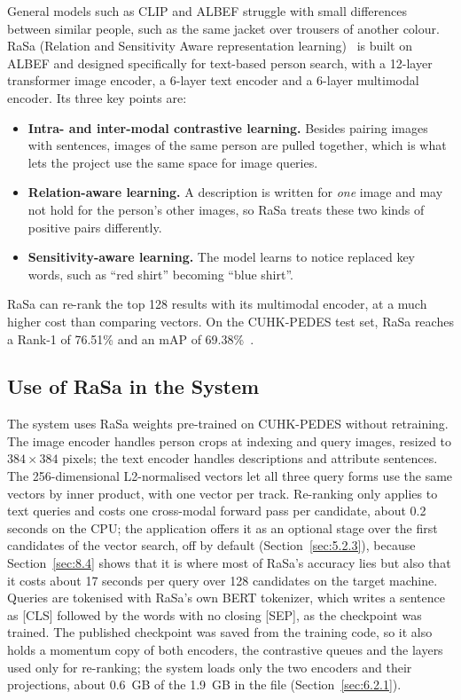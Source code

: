 General models such as CLIP and ALBEF struggle with small differences between similar people, such as the same jacket over trousers of another colour. RaSa (Relation and Sensitivity Aware representation learning)~\cite{bai2023rasa} is built on ALBEF and designed specifically for text-based person search, with a 12-layer transformer image encoder, a 6-layer text encoder and a 6-layer multimodal encoder. Its three key points are:
\begin{itemize}
    \item \textbf{Intra- and inter-modal contrastive learning.} Besides pairing images with sentences, images of the same person are pulled together, which is what lets the project use the same space for image queries.
    \item \textbf{Relation-aware learning.} A description is written for \emph{one} image and may not hold for the person's other images, so RaSa treats these two kinds of positive pairs differently.
    \item \textbf{Sensitivity-aware learning.} The model learns to notice replaced key words, such as ``red shirt'' becoming ``blue shirt''.
\end{itemize}
RaSa can re-rank the top 128 results with its multimodal encoder, at a much higher cost than comparing vectors. On the CUHK-PEDES test set, RaSa reaches a Rank-1 of 76.51\% and an mAP of 69.38\%~\cite{bai2023rasa}.

\subsection{Use of RaSa in the System}
\label{sec:3.5.4}

The system uses RaSa weights pre-trained on CUHK-PEDES without retraining. The image encoder handles person crops at indexing and query images, resized to $384 \times 384$ pixels; the text encoder handles descriptions and attribute sentences. The 256-dimensional L2-normalised vectors let all three query forms use the same vectors by inner product, with one vector per track. Re-ranking only applies to text queries and costs one cross-modal forward pass per candidate, about 0.2 seconds on the CPU; the application offers it as an optional stage over the first candidates of the vector search, off by default (Section~\ref{sec:5.2.3}), because Section~\ref{sec:8.4} shows that it is where most of RaSa's accuracy lies but also that it costs about 17 seconds per query over 128 candidates on the target machine. Queries are tokenised with RaSa's own BERT tokenizer, which writes a sentence as [CLS] followed by the words with no closing [SEP], as the checkpoint was trained. The published checkpoint was saved from the training code, so it also holds a momentum copy of both encoders, the contrastive queues and the layers used only for re-ranking; the system loads only the two encoders and their projections, about 0.6~GB of the 1.9~GB in the file (Section~\ref{sec:6.2.1}).

